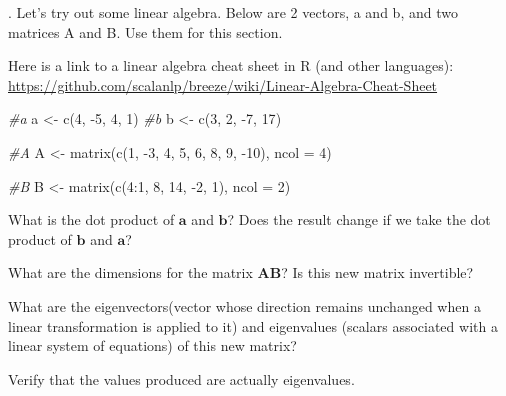 \documentclass[
]{article}
\newenvironment{Shaded}{\begin{snugshade}}{\end{snugshade}}
\newcommand{\AttributeTok}[1]{\textcolor[rgb]{0.77,0.63,0.00}{#1}}
\newcommand{\CommentTok}[1]{\textcolor[rgb]{0.56,0.35,0.01}{\textit{#1}}}
\newcommand{\DecValTok}[1]{\textcolor[rgb]{0.00,0.00,0.81}{#1}}
\newcommand{\FunctionTok}[1]{\textcolor[rgb]{0.00,0.00,0.00}{#1}}
\newcommand{\NormalTok}[1]{#1}
\newcommand{\OtherTok}[1]{\textcolor[rgb]{0.56,0.35,0.01}{#1}}
\newcommand{\SpecialCharTok}[1]{\textcolor[rgb]{0.00,0.00,0.00}{#1}}
\begin{document}
. Let's try out some linear algebra. Below are 2 vectors, a and b, and
two matrices A and B. Use them for this section.

Here is a link to a linear algebra cheat sheet in R (and other
languages):
\url{https://github.com/scalanlp/breeze/wiki/Linear-Algebra-Cheat-Sheet}

\begin{Shaded}
\begin{Highlighting}[]
\CommentTok{\#a}
\NormalTok{a }\OtherTok{\textless{}{-}} \FunctionTok{c}\NormalTok{(}\DecValTok{4}\NormalTok{, }\SpecialCharTok{{-}}\DecValTok{5}\NormalTok{, }\DecValTok{4}\NormalTok{, }\DecValTok{1}\NormalTok{)}
\CommentTok{\#b}
\NormalTok{b }\OtherTok{\textless{}{-}} \FunctionTok{c}\NormalTok{(}\DecValTok{3}\NormalTok{, }\DecValTok{2}\NormalTok{, }\SpecialCharTok{{-}}\DecValTok{7}\NormalTok{, }\DecValTok{17}\NormalTok{)}

\CommentTok{\#A}
\NormalTok{A }\OtherTok{\textless{}{-}} \FunctionTok{matrix}\NormalTok{(}\FunctionTok{c}\NormalTok{(}\DecValTok{1}\NormalTok{, }\SpecialCharTok{{-}}\DecValTok{3}\NormalTok{, }\DecValTok{4}\NormalTok{, }\DecValTok{5}\NormalTok{, }\DecValTok{6}\NormalTok{, }\DecValTok{8}\NormalTok{, }\DecValTok{9}\NormalTok{, }\SpecialCharTok{{-}}\DecValTok{10}\NormalTok{), }\AttributeTok{ncol =} \DecValTok{4}\NormalTok{)}

\CommentTok{\#B}
\NormalTok{B }\OtherTok{\textless{}{-}} \FunctionTok{matrix}\NormalTok{(}\FunctionTok{c}\NormalTok{(}\DecValTok{4}\SpecialCharTok{:}\DecValTok{1}\NormalTok{, }\DecValTok{8}\NormalTok{, }\DecValTok{14}\NormalTok{, }\SpecialCharTok{{-}}\DecValTok{2}\NormalTok{, }\DecValTok{1}\NormalTok{), }\AttributeTok{ncol =} \DecValTok{2}\NormalTok{)}
\end{Highlighting}
\end{Shaded}

What is the dot product of \(\mathbf{a}\) and \(\mathbf{b}\)? Does the
result change if we take the dot product of \(\mathbf{b}\) and
\(\mathbf{a}\)?

What are the dimensions for the matrix \(\mathbf{A}\mathbf{B}\)? Is this
new matrix invertible?

What are the eigenvectors(vector whose direction remains unchanged when
a linear transformation is applied to it) and eigenvalues (scalars
associated with a linear system of equations) of this new matrix?

Verify that the values produced are actually eigenvalues.
\end{document}
